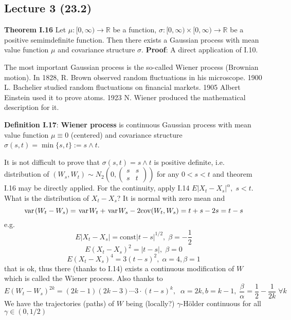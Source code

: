 \documentclass[english]{article}
\newcommand{\R}{\mathbb{R}}
\newcommand{\var}{\hspace{0.1em}\mathrm {var}\hspace{0.1em}}
\newcommand{\note}[1]{\noindent\textbf{#1}}
\begin{document}
\subsection*{Lecture 3 (23.2)}
\note{Theorem I.16} Let $\mu:[0,\infty)\to \R$ be a function, $\sigma:[0,\infty)\times [0,\infty) \to \R$ be a positive semimdefinite function. Then there exists a Gaussian process with mean value function $\mu$ and covariance structure $\sigma$. \newline
\textbf{Proof}: A direct application of I.10. \newline

The most important Gaussian process is the so-called Wiener process (Brownian motion). In 1828, R. Brown observed random fluctuations in his microscope. 1900 L. Bachelier studied random fluctuations on financial markets. 1905 Albert Einstein used it to prove atoms. 1923 N. Wiener produced the mathematical description for it.\newline

\note{Definition I.17}: \textbf{Wiener process} is continuous Gaussian process with mean value function $\mu \equiv 0$ (centered) and covariance structure $\sigma(s,t) = \min \{s,t\}:=s\wedge t$. \newline

It is not difficult to prove that $\sigma(s,t) = s\wedge t$ is positive definite, i.e. distribution of $(W_s, W_t) \sim N_2 ( 0 , \begin{pmatrix} s & s \\ s & t \end{pmatrix} )$ for any $0< s <t$ and theorem I.16 may be directly applied. For the continuity, apply I.14\newline
$E|X_t - X_s|^\alpha,\;  s<t$. What is the distribution of $X_t - X_s$? It is normal with zero mean and 
$$\var (W_t - W_s) = \var W_t + \var W_s - 2\text{cov} (W_t, W_s) = t+ s - 2s = t-s$$
e.g.
$$E|X_t - X_s| = \text{const} |t-s|^{1/2},\; \beta= -\frac 12$$
$$E(X_t - X_s)^2 = |t-s|,\; \beta = 0$$
$$E(X_t - X_s)^4 = 3(t-s)^2,\; \alpha = 4, \beta = 1$$
that is ok, thus there (thanks to I.14) exists a continuous modification of $W$ which is called the Wiener process. Also thanks to 
$$E(W_t -W_s)^{2k} = (2k-1)(2k-3) \cdots 3 \cdot (t-s)^k,\;\; \alpha = 2k, b= k-1, \; \frac{\beta}{\alpha} = \frac 12 - \frac 1{2k}\; \forall k$$
We have the trajectories (paths) of $W$ being (locally?) $\gamma$-H\"{o}lder continuous for all $\gamma \in (0,1/2 )$\newline
\end{document}
